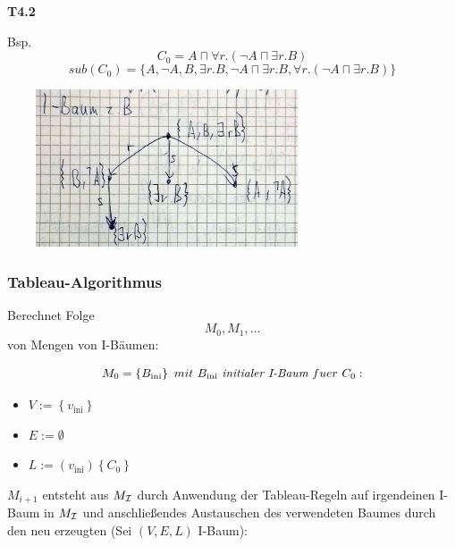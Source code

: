 \textbf{T4.2}

Bsp. $$C_0 = A \sqcap \forall r.(\neg A \sqcap \exists r.B)$$
$$sub(C_0) = \{A, \neg A, B, \exists r.B, \neg A \sqcap \exists r.B, \forall r.(\neg A \sqcap \exists r.B)\}$$

\includegraphics[width=3.71910in,height=1.83200in]{media/42ibaum.png}

\subsubsection{Tableau-Algorithmus}\label{tableau-algorithmus}

Berechnet Folge $$M_{0},M_{1},\ldots$$ von Mengen von I-Bäumen:

$$M_{0} = \left\{ B_{\text{ini}} \right\}\ mit\ B_{\text{ini}}\ \emph{initialer I-Baum}\ fuer\ C_{0}:$$

\begin{itemize}
\item
  $V := \left\{ v_{\text{ini}} \right\}$
\item
  $E := \emptyset$
\item
  $L := \left( v_{\text{ini}} \right) \left\{ C_{0} \right\}$
\end{itemize}

$M_{i + 1}$ entsteht aus $M_{\mathcal{I}}$ durch Anwendung der Tableau-Regeln
auf irgendeinen I-Baum in $M_{\mathcal{I}}$ und anschließendes Austauschen des
verwendeten Baumes durch den neu erzeugten (Sei $\left( V,E,L \right)$
I-Baum):


